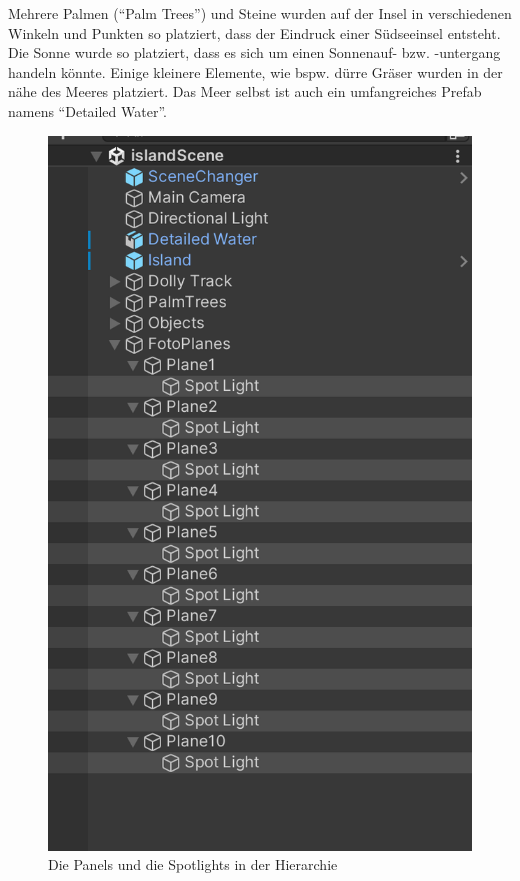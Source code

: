 Mehrere Palmen (``Palm Trees'') und Steine wurden auf der Insel in verschiedenen Winkeln und Punkten so platziert, dass der Eindruck einer Südseeinsel entsteht. Die Sonne wurde so platziert, dass es sich um einen Sonnenauf- bzw. -untergang handeln könnte. Einige kleinere Elemente, wie bspw. dürre Gräser wurden in der nähe des Meeres platziert. Das Meer selbst ist auch ein umfangreiches Prefab namens ``Detailed Water''. 


\begin{figure}
    \centering
    \includegraphics[scale=0.15]{pics/unity-island-light-setting.png}
    \caption{Die Panels und die Spotlights in der Hierarchie}
    \label{fig:unity-island-light-setting}


\end{figure}
